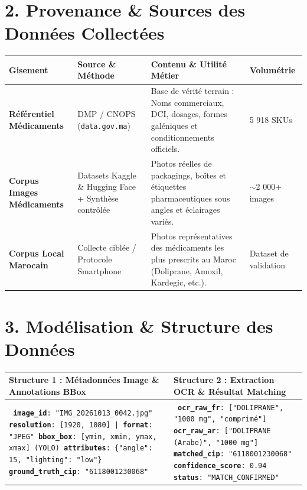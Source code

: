 \documentclass[10pt,a4paper]{article}
\begin{document}
\section*{2. Provenance \& Sources des Données Collectées}
\renewcommand{\arraystretch}{1.35}
\begin{small}
\begin{tabularx}{\textwidth}{@{}l p{4.5cm} X l@{}}
\toprule
\textbf{Gisement} & \textbf{Source \& Méthode} & \textbf{Contenu \& Utilité Métier} & \textbf{Volumétrie} \\
\midrule
\textbf{Référentiel Médicaments} & DMP / CNOPS (\texttt{data.gov.ma}) & Base de vérité terrain : Noms commerciaux, DCI, dosages, formes galéniques et conditionnements officiels. & 5 918 SKUs \\
\textbf{Corpus Images Médicaments} & Datasets Kaggle \& Hugging Face + Synthèse contrôlée & Photos réelles de packagings, boîtes et étiquettes pharmaceutiques sous angles et éclairages variés. & $\sim$2 000+ images \\
\textbf{Corpus Local Marocain} & Collecte ciblée / Protocole Smartphone & Photos représentatives des médicaments les plus prescrits au Maroc (Doliprane, Amoxil, Kardegic, etc.). & Dataset de validation \\
\bottomrule
\end{tabularx}
\end{small}

\vspace{0.25cm}

\section*{3. Modélisation \& Structure des Données}
\renewcommand{\arraystretch}{1.2}
\begin{small}
\begin{tabularx}{\textwidth}{@{}X X@{}}
\textbf{Structure 1 : Métadonnées Image \& Annotations BBox} & \textbf{Structure 2 : Extraction OCR \& Résultat Matching} \\
\midrule
\texttt{\small
\textbf{image\_id}: "IMG\_20261013\_0042.jpg"\newline
\textbf{resolution}: [1920, 1080] | \textbf{format}: "JPEG"\newline
\textbf{bbox\_box}: [ymin, xmin, ymax, xmax] (YOLO)\newline
\textbf{attributes}: \{"angle": 15, "lighting": "low"\}\newline
\textbf{ground\_truth\_cip}: "6118001230068"
} &
\texttt{\small
\textbf{ocr\_raw\_fr}: ["DOLIPRANE", "1000 mg", "comprimé"]\newline
\textbf{ocr\_raw\_ar}: ["DOLIPRANE (Arabe)", "1000 mg"]\newline
\textbf{matched\_cip}: "6118001230068"\newline
\textbf{confidence\_score}: 0.94\newline
\textbf{status}: "MATCH\_CONFIRMED"
} \\
\bottomrule
\end{tabularx}
\end{small}
\end{document}
